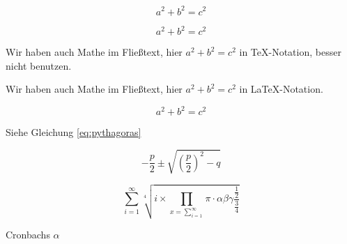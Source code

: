 \documentclass[12pt,ngerman,parskip=half]{scrartcl}
\begin{document}
\blindtext

\[ a^2 + b^2 = c^2 \]

$$ a^2 + b^2 = c^2$$

Wir haben auch Mathe im Fließtext, hier $a^2+b^2=c^2$ in \TeX-Notation, besser nicht benutzen.

Wir haben auch Mathe im Fließtext, hier \(a^2+b^2=c^2\) in \LaTeX-Notation.

\begin{equation}\label{eq:pythagoras}
 a^2 + b^2 = c^2
\end{equation}

Siehe Gleichung \ref{eq:pythagoras}

\begin{equation}\label{eq:pq}
-\frac{p}{2}\pm \sqrt{ \left(\frac{p}{2}\right)^2 - q }
\end{equation}

\begin{equation}
\sum_{i=1}^{\infty} \sqrt[4]{i\times \prod_{x=\sum_{i=1}^{\infty}} \pi \cdot \alpha \beta \gamma 
\frac{\frac{1}{2}}{\frac{3}{4}}
}
\end{equation}

Cronbachs \(\alpha\)


\blindtext
\end{document}
